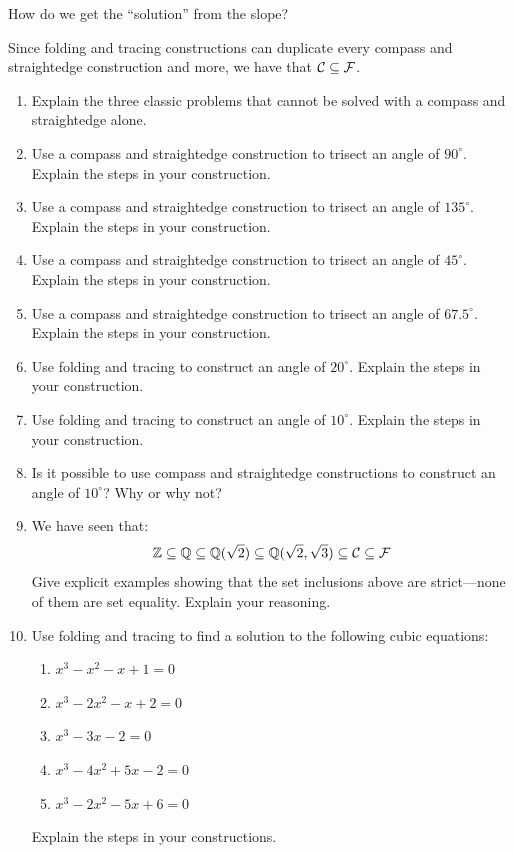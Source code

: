 \begin{question} How do we get the ``solution'' from the slope?
\end{question}
\QM

Since folding and tracing constructions can duplicate every compass and
straightedge construction and more, we have that $\mathcal C \subseteq \mathcal F$.


\begin{problems}
\begin{enumerate}
\item Explain the three classic problems that cannot be solved with a
  compass and straightedge alone.
\item Use a compass and straightedge construction to trisect an angle
  of $90^\circ$. Explain the steps in your construction.
\item Use a compass and straightedge construction to trisect an angle
  of $135^\circ$. Explain the steps in your construction.
\item Use a compass and straightedge construction to trisect an angle
  of $45^\circ$. Explain the steps in your construction.
\item Use a compass and straightedge construction to trisect an angle
  of $67.5^\circ$. Explain the steps in your construction.
\item Use folding and tracing to construct an angle of $20^\circ$. Explain the
  steps in your construction.
\item Use folding and tracing to construct an angle of $10^\circ$. Explain the
  steps in your construction.
\item Is it possible to use compass and straightedge constructions to
  construct an angle of $10^\circ$? Why or why not?
\item We have seen that:
\[
\mathbb Z \subseteq \mathbb Q \subseteq \mathbb Q(\sqrt{2}) \subseteq \mathbb Q(\sqrt{2},\sqrt{3})
\subseteq \mathcal C \subseteq \mathcal F
\]
Give explicit examples showing that the set inclusions above are
strict---none of them are set equality. Explain your reasoning.
\item Use folding and tracing to find a solution to the following cubic equations:
\begin{enumerate}
\item $x^3-x^2 -x+1= 0$ 
\item $x^3-2x^2 -x + 2 = 0$ 
\item $x^3 -3x-2=0$
\item $x^3-4x^2 +5x-2=0$
\item $x^3-2x^2-5x+6=0$
\end{enumerate}
Explain the steps in your constructions.
\end{enumerate}
\end{problems}


